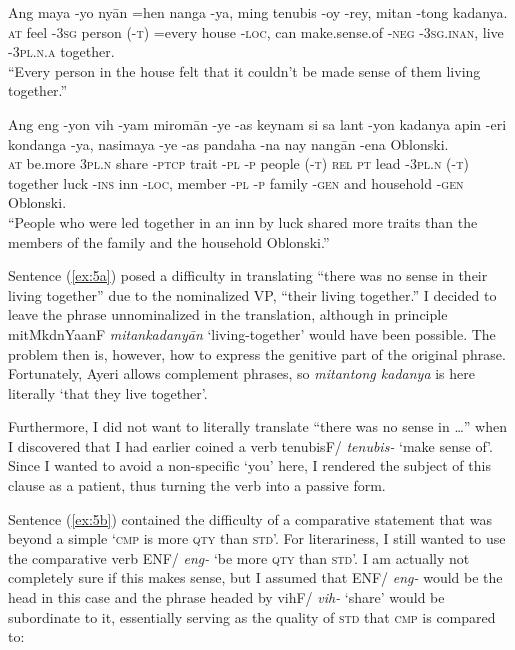 \documentclass[12pt,paper=letter]{scrartcl}
\newcommand{\fw}[1]{\textit{#1}} %
\newcommand{\q}[1]{\enquote{#1}} %
\newcommand{\qq}[1]{\enquote*{#1}} %
\newcommand{\mor}[1]{\textsc{\lowercase{#1}}}
\newcommand{\ayr}[1]{{\Tagati #1}}
\begin{document}
\begin{exe}  %
    \ex
    \begin{xlist}
	\ex \label{ex:5a}
	\gll Ang maya -yo nyān {} =hen nanga -ya, ming tenubis -oy -rey, 
	    mitan -tong kadanya. \\
	\mor{AT} feel \mor{-3SG} person \mor{(-T)} =every house \mor{-LOC}, can 
	    make.sense.of \mor{-NEG} \mor{-3SG.INAN}, live \mor{-3PL.N.A} 
	    together.\\
	\glt \q{Every person in the house felt that it couldn't be made sense 
	    of them living together.}
	
	\ex \label{ex:5b}
	\gll Ang eng -yon vih -yam miromān -ye -as keynam {} si sa lant -yon {} 
	    kadanya apin -eri kondanga -ya, nasimaya -ye -as pandaha -na nay 
	    nangān -ena Oblonski. \\
	\mor{AT} be.more \mor{3PL.N} share \mor{-PTCP} trait \mor{-PL} \mor{-P} 
	    people \mor{(-T)} \mor{REL} \mor{PT} lead \mor{-3PL.N} \mor{(-T)} 
	    together luck \mor{-INS} inn \mor{-LOC}, member 
	    \mor{-PL} \mor{-P} family \mor{-GEN} and household \mor{-GEN} 
	    Oblonski. \\
	\glt \q{People who were led together in an inn by luck shared more 
	    traits than the members of the family and the household Oblonski.}
    \end{xlist}
\end{exe}

Sentence (\ref{ex:5a}) posed a difficulty in translating \q{there was no sense 
in their living together} \autocite{tolstoy} due to the nominalized VP,
\q{their living together.} I decided to leave the phrase unnominalized in the 
translation, although in principle \ayr{mitMkdnYaanF} \fw{mitankadanyān} 
\qq{living-together} would have been possible. The problem then is, however, 
how to express the genitive part of the original phrase. Fortunately, Ayeri 
allows complement phrases, so \fw{mitantong kadanya} is here literally \qq{that 
they live together}.

Furthermore, I did not want to literally translate \q{there was no sense in …} 
when I discovered that I had earlier coined a verb \ayr{tenubisF/} \fw{tenubis-} 
\qq{make sense of}. Since I wanted to avoid a non-specific \qq{you} here, I 
rendered the subject of this clause as a patient, thus turning the verb into 
a passive form.

Sentence (\ref{ex:5b}) contained the difficulty of a comparative statement that
was beyond a simple \qq{\mor{CMP} is more \mor{QTY} than \mor{STD}}. For literariness, 
I still wanted to use the comparative verb \ayr{ENF/} \fw{eng-} \qq{be more 
\mor{QTY} than \mor{STD}}. I am actually not completely sure if this makes sense,
but I assumed that \ayr{ENF/} \fw{eng-} would be the head in this case and
the phrase headed by \ayr{vihF/} \fw{vih-} \qq{share} would be subordinate to 
it, essentially serving as the quality of \mor{STD} that \mor{CMP} is compared to:
\end{document}
